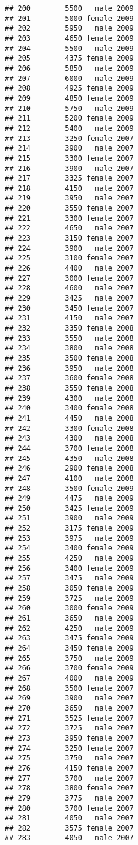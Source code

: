 \documentclass[
]{article}
\begin{document}
\begin{verbatim}
## 200        5500   male 2009
## 201        5000 female 2009
## 202        5950   male 2009
## 203        4650 female 2009
## 204        5500   male 2009
## 205        4375 female 2009
## 206        5850   male 2009
## 207        6000   male 2009
## 208        4925 female 2009
## 209        4850 female 2009
## 210        5750   male 2009
## 211        5200 female 2009
## 212        5400   male 2009
## 213        3250 female 2007
## 214        3900   male 2007
## 215        3300 female 2007
## 216        3900   male 2007
## 217        3325 female 2007
## 218        4150   male 2007
## 219        3950   male 2007
## 220        3550 female 2007
## 221        3300 female 2007
## 222        4650   male 2007
## 223        3150 female 2007
## 224        3900   male 2007
## 225        3100 female 2007
## 226        4400   male 2007
## 227        3000 female 2007
## 228        4600   male 2007
## 229        3425   male 2007
## 230        3450 female 2007
## 231        4150   male 2007
## 232        3350 female 2008
## 233        3550   male 2008
## 234        3800   male 2008
## 235        3500 female 2008
## 236        3950   male 2008
## 237        3600 female 2008
## 238        3550 female 2008
## 239        4300   male 2008
## 240        3400 female 2008
## 241        4450   male 2008
## 242        3300 female 2008
## 243        4300   male 2008
## 244        3700 female 2008
## 245        4350   male 2008
## 246        2900 female 2008
## 247        4100   male 2008
## 248        3500 female 2009
## 249        4475   male 2009
## 250        3425 female 2009
## 251        3900   male 2009
## 252        3175 female 2009
## 253        3975   male 2009
## 254        3400 female 2009
## 255        4250   male 2009
## 256        3400 female 2009
## 257        3475   male 2009
## 258        3050 female 2009
## 259        3725   male 2009
## 260        3000 female 2009
## 261        3650   male 2009
## 262        4250   male 2009
## 263        3475 female 2009
## 264        3450 female 2009
## 265        3750   male 2009
## 266        3700 female 2009
## 267        4000   male 2009
## 268        3500 female 2007
## 269        3900   male 2007
## 270        3650   male 2007
## 271        3525 female 2007
## 272        3725   male 2007
## 273        3950 female 2007
## 274        3250 female 2007
## 275        3750   male 2007
## 276        4150 female 2007
## 277        3700   male 2007
## 278        3800 female 2007
## 279        3775   male 2007
## 280        3700 female 2007
## 281        4050   male 2007
## 282        3575 female 2007
## 283        4050   male 2007

\end{verbatim}
\end{document}

